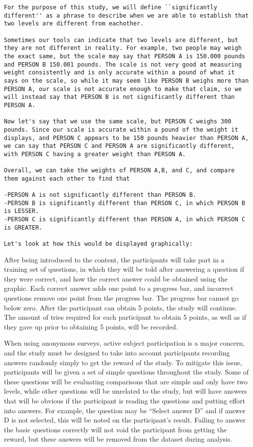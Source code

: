 \documentclass{article}
\begin{document}
\begin{lstlisting}
For the purpose of this study, we will define ``significantly different'' as a phrase to describe when we are able to establish that two levels are different from eachother.

Sometimes our tools can indicate that two levels are different, but they are not different in reality. For example, two people may weigh the exact same, but the scale may say that PERSON A is 150.000 pounds and PERSON B 150.001 pounds. The scale is not very good at measuring weight consistently and is only accurate within a pound of what it says on the scale, so while it may seem like PERSON B weighs more than PERSON A, our scale is not accurate enough to make that claim, so we will instead say that PERSON B is not significantly different than PERSON A.

Now let's say that we use the same scale, but PERSON C weighs 300 pounds. Since our scale is accurate within a pound of the weight it displays, and PERSON C appears to be 150 pounds heavier than PERSON A, we can say that PERSON C and PERSON A are significantly different, with PERSON C having a greater weight than PERSON A. 

Overall, we can take the weights of PERSON A,B, and C, and compare them against each other to find that

-PERSON A is not significantly different than PERSON B.
-PERSON B is significantly different than PERSON C, in which PERSON B is LESSER.
-PERSON C is significantly different than PERSON A, in which PERSON C is GREATER.

Let's look at how this would be displayed graphically:
\end{lstlisting}

After being introduced to the content, the participants will take part in a training set of questions, in which they will be told after answering a question if they were correct, and how the correct answer could be obtained using the graphic. Each correct answer adds one point to a progress bar, and incorrect questions remove one point from the progress bar. The progress bar cannot go below zero. After the participant can obtain 5 points, the study will continue. The amount of tries required for each participant to obtain 5 points, as well as if they gave up prior to obtaining 5 points, will be recorded.


When using anonymous surveys, active subject participation is a major concern, and the study must be designed to take into account participants recording answers randomly simply to get the reward of the study. To mitigate this issue, participants will be given a set of simple questions throughout the study. Some of these questions will be evaluating comparisons that are simple and only have two levels, while other questions will be unrelated to the study, but will have answers that will be obvious if the participant is reading the questions and putting effort into answers. For example, the question may be ``Select answer D'' and if answer D is not selected, this will be noted on the participant's result. Failing to answer the basic questions correctly will not void the participant from getting the reward, but these answers will be removed from the dataset during analysis.
\end{document}
